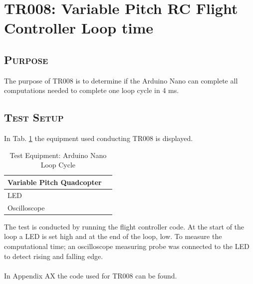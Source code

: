 \section{TR008: Variable Pitch RC Flight Controller Loop time}
         {}

\subsection*{\textsc{\medium Purpose}}
The purpose of TR008 is to determine if the Arduino Nano can complete all computations needed to complete one loop cycle in 4 ms.

\subsection*{\textsc{\medium Test Setup}}
In Tab. \ref{tab:tabt10} the equipment used conducting TR008 is displayed. 
\begin {table}[H]
    \begin{center}
    \caption {Test Equipment: Arduino Nano Loop Cycle} 
    \label{tab:tabt10} 
    \begin{tabular}{|l|l|}\hline 
        Variable Pitch Quadcopter     \\ \hline
        LED  \\ \hline
        Oscilloscope  \\ \hline
        \end{tabular}
    \end{center}
\end{table}

The test is conducted by running the flight controller code. At the start of the loop a LED is set high and at the end of the loop, low. To measure the computational time; an oscilloscope measuring probe was connected to the LED to detect rising and falling edge.\\
\\
In Appendix AX the code used for TR008 can be found. \\
\\

